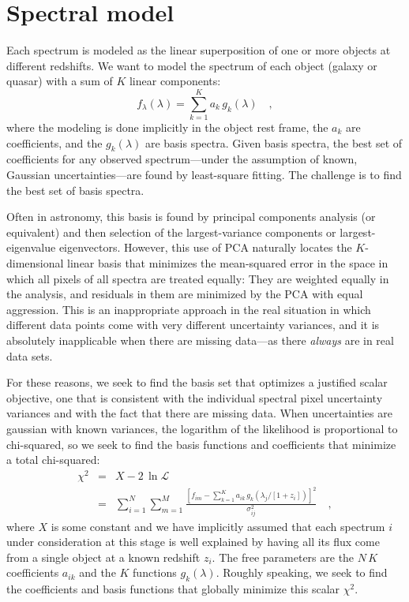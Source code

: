 \documentclass[12pt]{article}
\newcommand{\like}{\mathscr{L}}
\begin{document}
\section{Spectral model}

Each spectrum is modeled as the linear superposition of one or more
objects at different redshifts.  We want to model the spectrum of each
object (galaxy or quasar) with a sum of $K$ linear components:
\begin{equation}
f_{\lambda}(\lambda) = \sum_{k=1}^{K} a_k\,g_k(\lambda)
\quad ,
\end{equation}
where the modeling is done implicitly in the object rest frame, the
$a_k$ are coefficients, and the $g_k(\lambda)$ are basis spectra.
Given basis spectra, the best set of coefficients for any observed
spectrum---under the assumption of known, Gaussian uncertainties---are
found by least-square fitting.  The challenge is to find the
best set of basis spectra.

Often in astronomy, this basis is found by principal components
analysis (or equivalent) and then selection of the largest-variance
components or largest-eigenvalue eigenvectors.  However, this use of
PCA naturally locates the $K$-dimensional linear basis that minimizes
the mean-squared error in the space in which all pixels of all spectra
are treated equally: They are weighted equally in the analysis, and
residuals in them are minimized by the PCA with equal aggression.
This is an inappropriate approach in the real situation in which
different data points come with very different uncertainty variances,
and it is absolutely inapplicable when there are missing data---as
there \emph{always} are in real data sets.

For these reasons, we seek to find the basis set that optimizes a
justified scalar objective, one that is consistent with the individual
spectral pixel uncertainty variances and with the fact that there are
missing data.  When uncertainties are gaussian with known variances,
the logarithm of the likelihood is proportional to chi-squared, so we
seek to find the basis functions and coefficients that minimize a
total chi-squared:
\begin{eqnarray}\displaystyle
\chi^2 & = & X - 2\,\ln\like \nonumber\\
 & = & \sum_{i=1}^N \sum_{m=1}^M
\frac{\left[f_{im}-\sum_{k=1}^K a_{ik}
                      \,g_k(\lambda_j/[1+z_i])\right]^2}
{\sigma^2_{ij}}
\quad ,
\end{eqnarray}
where $X$ is some constant and we have implicitly assumed that each
spectrum $i$ under consideration at this stage is well explained by
having all its flux come from a single object at a known redshift
$z_i$.  The free parameters are the $N\,K$ coefficients $a_{ik}$ and
the $K$ functions $g_k(\lambda)$.  Roughly speaking, we seek to find
the coefficients and basis functions that globally minimize this
scalar $\chi^2$.
\end{document}
